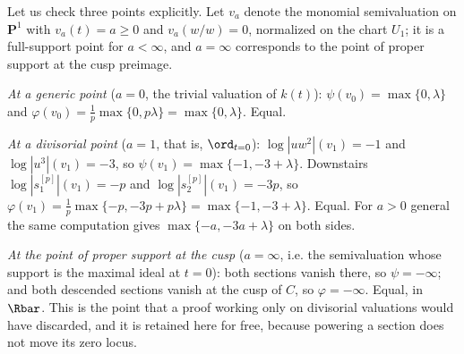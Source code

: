 \begin{example}
Let us check three points explicitly.  Let $v_a$ denote the monomial
semivaluation on $\mathbf P^1$ with $v_a(t)=a\ge0$ and
$v_a(w/w)=0$, normalized on the chart $U_1$; it is a full-support point
for $a<\infty$, and $a=\infty$ corresponds to the point of proper
support at the cusp preimage.

\emph{At a generic point} ($a=0$, the trivial valuation of
$k(t)$): $\psi(v_0)=\max\{0,\lambda\}$ and
$\varphi(v_0)=\frac1p\max\{0,p\lambda\}=\max\{0,\lambda\}$.  Equal.

\emph{At a divisorial point} ($a=1$, that is, $\ord_{t=0}$):
$\log|uw^2|(v_1)=-1$ and $\log|u^3|(v_1)=-3$, so
$\psi(v_1)=\max\{-1,-3+\lambda\}$.  Downstairs
$\log|s_1^{[p]}|(v_1)=-p$ and $\log|s_2^{[p]}|(v_1)=-3p$, so
$\varphi(v_1)=\frac1p\max\{-p,-3p+p\lambda\}=\max\{-1,-3+\lambda\}$.
Equal.  For $a>0$ general the same computation gives
$\max\{-a,-3a+\lambda\}$ on both sides.

\emph{At the point of proper support at the cusp} ($a=\infty$, i.e. the
semivaluation whose support is the maximal ideal at $t=0$): both sections
vanish there, so $\psi=-\infty$; and both descended sections vanish at the
cusp of $C$, so $\varphi=-\infty$.  Equal, in $\Rbar$.  This is the
point that a proof working only on divisorial valuations would have
discarded, and it is retained here for free, because powering a section does
not move its zero locus.
\end{example}

